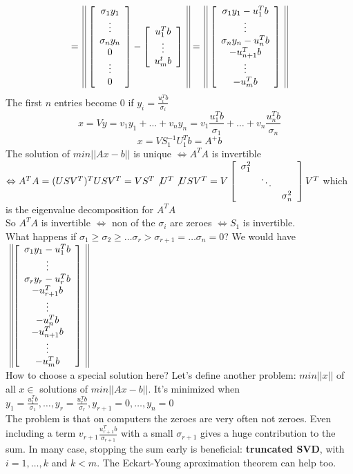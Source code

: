 \documentclass[10pt]{report}
\begin{document}
$$=\:\:\vline\:\vline\left[\begin{array}{c}
\sigma_1y_1\\\vdots\\\sigma_ny_n\\0\\\vdots\\0
\end{array}\right] - \left[\begin{array}{c}
u_1^Tb\\\vdots\\u_m^tb
\end{array}\right] \:\:\vline\:\vline = \:\:\vline\:\vline\left[\begin{array}{c}
\sigma_1y_1-u_1^Tb\\\vdots\\\sigma_ny_n-u_n^Tb\\-u_{n+1}^Tb\\\vdots\\-u_m^Tb
\end{array}\right]\:\:\vline\:\vline$$
The first $n$ entries become $0$ if $y_i = \frac{u_i^Tb}{\sigma_i}$\\
$$x = Vy = v_1y_1 + \ldots + v_ny_n = v_1\frac{u_1^Tb}{\sigma_1} + \ldots + v_n\frac{u_n^Tb}{\sigma_n}$$
$$x = VS_1^{-1}U_1^Tb = A^+b$$
The solution of $min ||Ax-b||$ is unique $\Leftrightarrow A^TA$ is invertible $\Leftrightarrow A^TA=(USV^T)^TUSV^T = VS^T\not U^T\not USV^T = V\left[\begin{array}{c c c}
\sigma_1^2\\
& \ddots\\
& & \sigma_n^2
\end{array}\right]V^T$ which is the eigenvalue decomposition for $A^TA$\\
So $A^TA$ is invertible $\Leftrightarrow$ non of the $\sigma_i$ are zeroes $\Leftrightarrow S_1$ is invertible.\\
What happens if $\sigma_1\geq \sigma_2 \geq \ldots \sigma_r > \sigma_{r+1} = \ldots \sigma_n = 0$? We would have $\:\:\vline\:\vline\left[\begin{array}{c}
\sigma_1y_1-u_1^Tb\\\vdots\\\sigma_ry_r-u_r^Tb\\-u_{r+1}^Tb\\\vdots\\-u_n^Tb\\-u_{n+1}^Tb\\\vdots\\-u_m^Tb
\end{array}\right]\:\:\vline\:\vline$\\How to choose a special solution here? Let's define another problem: $min ||x||$ of all $x\in$ solutions of $min ||Ax-b||$. It's minimized when $y_1 = \frac{u_1^Tb}{\sigma_1}, \ldots, y_r = \frac{u_r^Tb}{\sigma_r}, y_{r+1} = 0,\ldots,y_n = 0$\\
The problem is that on computers the zeroes are very often not zeroes. Even including a term $v_{r+1}\frac{u_{r+1}^Tb}{\sigma_{r+1}}$ with a small $\sigma_{r+1}$ gives a huge contribution to the sum. In many case, stopping the sum early is beneficial: \textbf{truncated SVD}, with $i=1,\ldots,k$ and $k<m$. The Eckart-Young aproximation theorem can help too.
\end{document}

